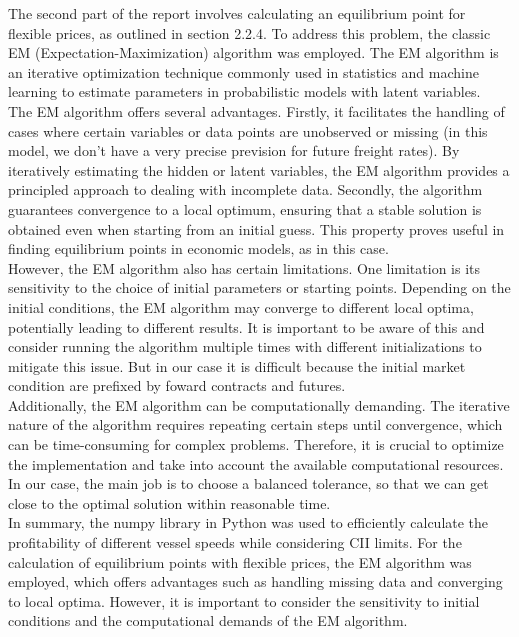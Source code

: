 \documentclass[a4paper,12pt]{article}
\begin{document}
The second part of the report involves calculating an equilibrium point for flexible prices, as outlined in section 2.2.4. To address this problem, the classic EM (Expectation-Maximization) algorithm was employed. The EM algorithm is an iterative optimization technique commonly used in statistics and machine learning to estimate parameters in probabilistic models with latent variables.\\

The EM algorithm offers several advantages. Firstly, it facilitates the handling of cases where certain variables or data points are unobserved or missing (in this model, we don't have a very precise prevision for future freight rates). By iteratively estimating the hidden or latent variables, the EM algorithm provides a principled approach to dealing with incomplete data. Secondly, the algorithm guarantees convergence to a local optimum, ensuring that a stable solution is obtained even when starting from an initial guess. This property proves useful in finding equilibrium points in economic models, as in this case.\\

However, the EM algorithm also has certain limitations. One limitation is its sensitivity to the choice of initial parameters or starting points. Depending on the initial conditions, the EM algorithm may converge to different local optima, potentially leading to different results. It is important to be aware of this and consider running the algorithm multiple times with different initializations to mitigate this issue. But in our case it is difficult because the initial market condition are prefixed by foward contracts and futures.\\

Additionally, the EM algorithm can be computationally demanding. The iterative nature of the algorithm requires repeating certain steps until convergence, which can be time-consuming for complex problems. Therefore, it is crucial to optimize the implementation and take into account the available computational resources. In our case, the main job is to choose a balanced tolerance, so that we can get close to the optimal solution within reasonable time.\\

In summary, the numpy library in Python was used to efficiently calculate the profitability of different vessel speeds while considering CII limits. For the calculation of equilibrium points with flexible prices, the EM algorithm was employed, which offers advantages such as handling missing data and converging to local optima. However, it is important to consider the sensitivity to initial conditions and the computational demands of the EM algorithm.\\
\end{document}
